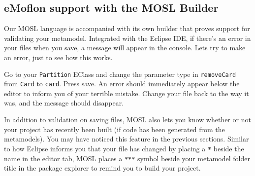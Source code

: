 \newpage
\texHeader

\hypertarget{validation tex}{} 
\subsection{eMoflon support with the MOSL Builder }

Our MOSL language is accompanied with its own builder that proves support for validating your metamodel.
Integrated with the Eclipse IDE, if there's an error in your files when you save, a message will appear in the console. Lets try to make an error, just to
see how this works.

Go to your \texttt{Partition} EClass and change the parameter type in \texttt{removeCard} from \texttt{Card} to \texttt{card}. Press save. An error should
immediately appear below the editor to inform you of your terrible mistake. Change your file back to the way it was, and the message should disappear.

In addition to validation on saving files, MOSL also lets you know whether or not your project has
recently been built (if code has been generated from the metamodels). You may have noticed this feature in the previous sections. Similar to how Eclipse
informs you that your file has changed by placing a \texttt{*} beside the name in the editor tab, MOSL places a \texttt{***} symbol beside your metamodel folder
title in the package explorer to remind you to build your project.

